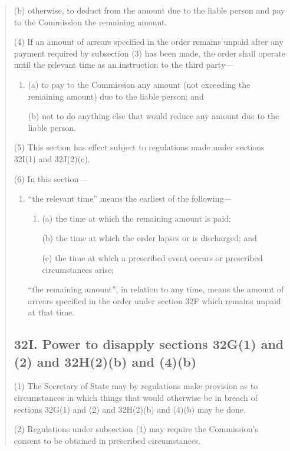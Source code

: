 \documentclass[a4paper]{article}
\begin{document}
\begin{quotation}
\begin{enumerate}
(b) otherwise, to deduct from the amount due to the liable person and pay to the
Commission the remaining amount.
\end{enumerate}

(4) If an amount of arrears specified in the order remains unpaid after any payment
required by subsection (3) has been made, the order shall operate until the relevant
time as an instruction to the third party---
\begin{enumerate}\item[]
(a) to pay to the Commission any amount (not exceeding the remaining
amount) due to the liable person; and

(b) not to do anything else that would reduce any amount due to the liable
person.
\end{enumerate}

(5) This section has effect subject to regulations made under sections 32I(1) and
32J(2)(c).

(6) In this section---
\begin{enumerate}\item[]
“the relevant time” means the earliest of the following---
\begin{enumerate}\item[]
(a) the time at which the remaining amount is paid;

(b) the time at which the order lapses or is discharged; and

(c) the time at which a prescribed event occurs or prescribed circumstances
arise;
\end{enumerate}

“the remaining amount”, in relation to any time, means the amount of arrears
specified in the order under section 32F which remains unpaid at that time.
\end{enumerate}

\begin{sloppypar}
\subsection*{32I. Power to disapply sections 32G(1) and (2) and 32H(2)(b) and (4)(b)}
\end{sloppypar}

(1) The Secretary of State may by regulations make provision as to
circumstances in which things that would otherwise be in breach of sections 32G(1) and (2) and 32H(2)(b) and (4)(b) may be done.

(2) Regulations under subsection (1) may require the Commission’s consent
to be obtained in prescribed circumstances.


\end{quotation}
\end{document}
